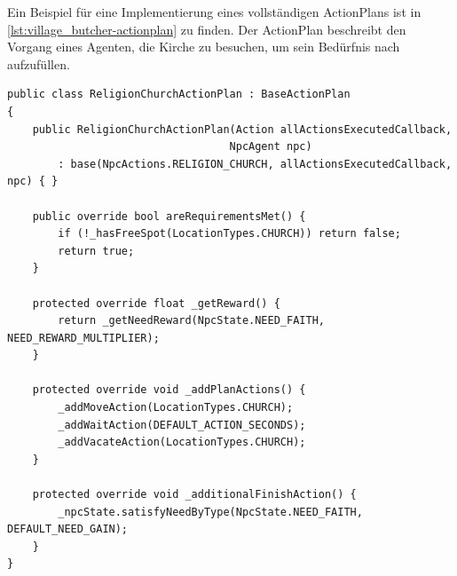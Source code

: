 Ein Beispiel für eine Implementierung eines vollständigen ActionPlans ist in \ref{lst:village_butcher-actionplan} zu finden. Der ActionPlan  beschreibt den Vorgang eines Agenten, die Kirche zu besuchen, um sein Bedürfnis nach  aufzufüllen.

\begin{minipage}{\linewidth}
\begin{lstlisting}[linewidth=16.4cm, label=lst:village_butcher-actionplan, caption=Beispielhafter ActionPlan \inlinecode{ReligionChurchActionPlan}, xleftmargin=1cm, basicstyle=\footnotesize]
public class ReligionChurchActionPlan : BaseActionPlan
{
    public ReligionChurchActionPlan(Action allActionsExecutedCallback,
                                   NpcAgent npc)
        : base(NpcActions.RELIGION_CHURCH, allActionsExecutedCallback, npc) { }

    public override bool areRequirementsMet() {
        if (!_hasFreeSpot(LocationTypes.CHURCH)) return false;
        return true;
    }

    protected override float _getReward() {
        return _getNeedReward(NpcState.NEED_FAITH, NEED_REWARD_MULTIPLIER);
    }

    protected override void _addPlanActions() {
        _addMoveAction(LocationTypes.CHURCH);
        _addWaitAction(DEFAULT_ACTION_SECONDS);
        _addVacateAction(LocationTypes.CHURCH);
    }

    protected override void _additionalFinishAction() {
        _npcState.satisfyNeedByType(NpcState.NEED_FAITH, DEFAULT_NEED_GAIN);
    }
}
\end{lstlisting}
\end{minipage}

